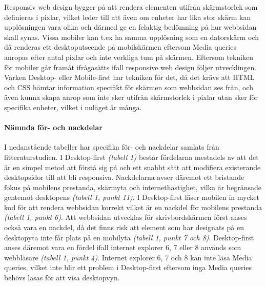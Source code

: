 \documentclass[11pt]{article}
\begin{document}
Responsiv web design bygger på att rendera elementen utifrån skärmstorlek som definieras i pixlar, vilket leder till att även om enheter har lika stor skärm kan upplösningen vara olika och därmed ge en felaktig bedömning på hur webbsidan skall synas. Vissa mobiler kan t.ex ha samma upplösning som en datorskärm och då renderas ett desktoputseende på mobilskärmen eftersom Media queries anropas efter antal pixlar och inte verkliga tum på skärmen. Eftersom tekniken för mobiler går framåt ifrågasätts ifall responsive web design följer utvecklingen. Varken Desktop- eller Mobile-first har tekniken för det, då det krävs att HTML och CSS hämtar information specifikt för skärmen som webbsidan ses från, och även kunna skapa anrop som inte sker utifrån skärmstorlek i pixlar utan sker för specifika enheter, vilket i nuläget är många.


\paragraph{Nämnda för- och nackdelar}\mbox{}

I nedanstående tabeller har specifika för- och nackdelar samlats från litteraturstudien. I Desktop-first \textit{(tabell 1)} består fördelarna mestadels av att det är en simpel metod att förstå sig på och ett snabbt sätt att modifiera existerande desktopsidor till att bli responsiva. Nackdelarna avser däremot ett bristande fokus på mobilens prestanda, skärmyta och internethastighet, vilka är begränsade gentemot desktopens \textit{(tabell 1, punkt 11)}. I Desktop-first läser mobilen in mycket kod för att rendera webbsidan korrekt vilket är en nackdel för mobilens prestanda \textit{(tabell 1, punkt 6)}. Att webbsidan utvecklas för skrivbordskärmen först anses också vara en nackdel, då det finns risk att element som har designats på en desktopyta inte får plats på en mobilyta \textit{(tabell 1, punkt 7 och 8)}. Desktop-first anses däremot vara en fördel ifall internet explorer 6, 7 eller 8 används som webbläsare \textit{(tabell 1, punkt 4)}. Internet explorer 6, 7 och 8 kan inte läsa Media queries, vilket inte blir ett problem i Desktop-first eftersom inga Media queries behövs läsas för att visa desktopvyn.
\end{document}
